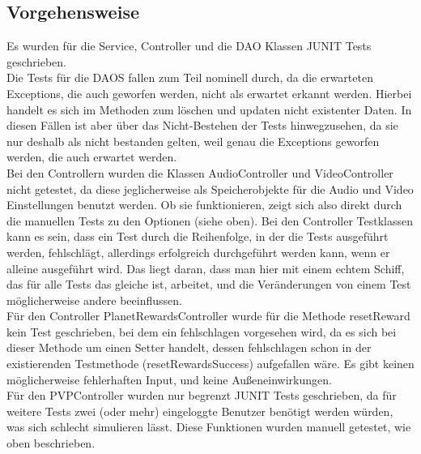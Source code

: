 \documentclass[fontsize=12pt,paper=a4,twoside]{scrartcl}
\begin{document}
\subsection{Vorgehensweise}
Es wurden für die Service, Controller und die DAO Klassen JUNIT Tests geschrieben. \\
Die Tests für die DAOS fallen zum Teil nominell durch, da die erwarteten Exceptions, die auch geworfen werden, nicht als erwartet erkannt werden. Hierbei handelt es sich im Methoden zum löschen und updaten nicht existenter Daten. In diesen Fällen ist aber über das Nicht-Bestehen der Tests hinwegzusehen, da sie nur deshalb als nicht bestanden gelten, weil genau die Exceptions geworfen werden, die auch erwartet werden. \\
Bei den Controllern wurden die Klassen AudioController und VideoController nicht getestet, da diese jeglicherweise als Speicherobjekte für die Audio und Video Einstellungen benutzt werden. Ob sie funktionieren, zeigt sich also direkt durch die manuellen Tests zu den Optionen (siehe oben). Bei den Controller Testklassen kann es sein, dass ein Test durch die Reihenfolge, in der die Tests ausgeführt werden, fehlschlägt, allerdings erfolgreich durchgeführt werden kann, wenn er alleine ausgeführt wird. Das liegt daran, dass man hier mit einem echtem Schiff, das für alle Tests das gleiche ist, arbeitet, und die Veränderungen von einem Test möglicherweise andere beeinflussen. \\
Für den Controller PlanetRewardsController wurde für die Methode resetReward kein Test geschrieben, bei dem ein fehlschlagen vorgesehen wird, da es sich bei dieser Methode um einen Setter handelt, dessen fehlschlagen schon in der existierenden Testmethode (resetRewardsSuccess) aufgefallen wäre. Es gibt keinen möglicherweise fehlerhaften Input, und keine Außeneinwirkungen. \\
Für den PVPController wurden nur begrenzt JUNIT Tests geschrieben, da für weitere Tests zwei (oder mehr) eingeloggte Benutzer benötigt werden würden, was sich schlecht simulieren lässt. Diese Funktionen wurden manuell getestet, wie oben beschrieben. \\
\end{document}
